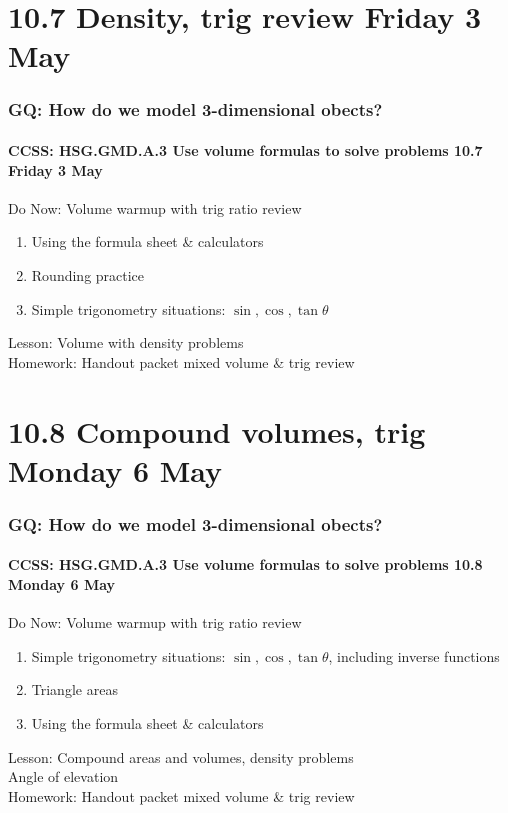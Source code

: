 \documentclass{beamer}
\begin{document}
\section{10.7 Density, trig review Friday 3 May}
  \frame
  {
    \frametitle{GQ: How do we model 3-dimensional obects?}
    \framesubtitle{CCSS: HSG.GMD.A.3 Use volume formulas to solve problems \hfill \alert{10.7 Friday 3 May}}
    \begin{block}{Do Now: Volume warmup with trig ratio review}
      \begin{enumerate}
        \item Using the formula sheet \& calculators
        \item Rounding practice
        \item Simple trigonometry situations: $\sin, \cos, \tan \theta$
    \end{enumerate}
    \end{block}
    Lesson: Volume with density problems\\[1cm]
    Homework: Handout packet mixed volume \& trig review
  }

  \section{10.8 Compound volumes, trig Monday 6 May}
    \frame
    {
      \frametitle{GQ: How do we model 3-dimensional obects?}
      \framesubtitle{CCSS: HSG.GMD.A.3 Use volume formulas to solve problems \hfill \alert{10.8 Monday 6 May}}
        \begin{block}{Do Now: Volume warmup with trig ratio review}
          \begin{enumerate}
            \item Simple trigonometry situations: $\sin, \cos, \tan \theta$, including inverse functions
            \item Triangle areas
            \item Using the formula sheet \& calculators
        \end{enumerate}
        \end{block}
      Lesson: Compound areas and volumes, density problems\\
      Angle of elevation\\[0.5cm]
      Homework: Handout packet mixed volume \& trig review
    }
\end{document}
